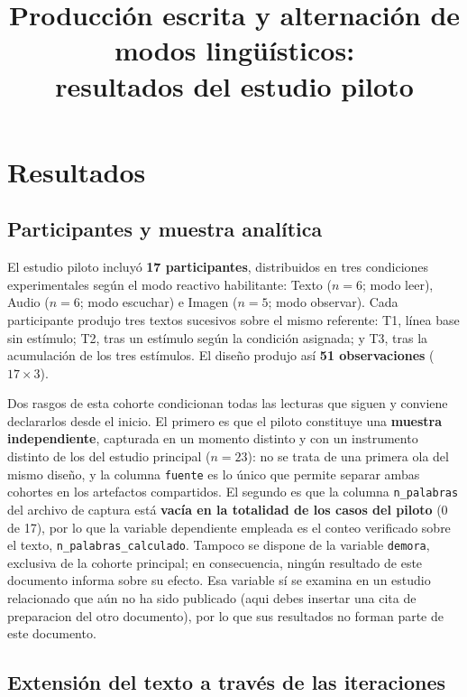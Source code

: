 \documentclass[12pt]{article}
\title{Producción escrita y alternación de modos lingüísticos:\\ resultados del estudio piloto}
\author{}
\date{}
\begin{document}
	
	\maketitle
	
	\section{Resultados}
	
	\subsection{Participantes y muestra analítica}
	
	El estudio piloto incluyó \textbf{17 participantes}, distribuidos en tres condiciones experimentales según el modo reactivo habilitante: Texto ($n = 6$; modo leer), Audio ($n = 6$; modo escuchar) e Imagen ($n = 5$; modo observar). Cada participante produjo tres textos sucesivos sobre el mismo referente: T1, línea base sin estímulo;
	T2, tras un estímulo según la condición asignada; y T3, tras la acumulación de los tres estímulos. El diseño produjo así \textbf{51 observaciones} ($17 \times 3$).
	
	Dos rasgos de esta cohorte condicionan todas las lecturas que siguen y conviene declararlos desde el inicio. El primero es que el piloto constituye una \textbf{muestra independiente}, capturada en un momento distinto y con un instrumento distinto de los del estudio principal
	($n = 23$): no se trata de una primera ola del mismo diseño, y la columna \texttt{fuente} es lo único que permite separar ambas cohortes en los artefactos compartidos. El segundo es que la columna \texttt{n\_palabras} del archivo de captura está \textbf{vacía en la totalidad de los casos del piloto} (0 de 17), por lo que la variable dependiente empleada es el conteo verificado sobre el texto, \texttt{n\_palabras\_calculado}. Tampoco se dispone de la variable \texttt{demora}, exclusiva de la cohorte principal; en consecuencia, ningún resultado de este documento informa sobre su efecto. Esa variable sí se examina en un estudio relacionado que aún no ha sido publicado (aqui debes insertar una cita de preparacion del otro documento), por lo que sus resultados no forman parte de este documento.
	
	\subsection{Extensión del texto a través de las iteraciones}
	
\end{document}
